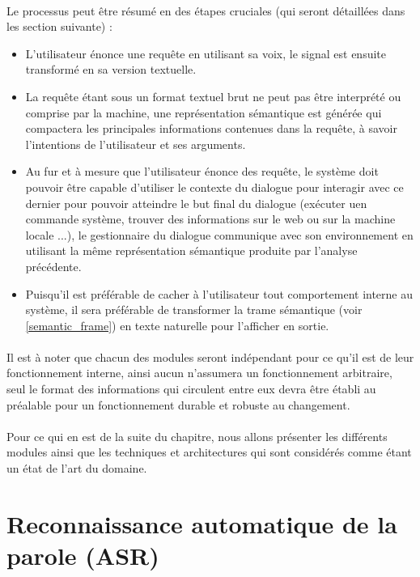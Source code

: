 	\paragraph{}
	Le processus peut être résumé en des étapes cruciales (qui seront détaillées dans les section suivante) : 
	\begin{itemize}
		\item L'utilisateur énonce une requête en utilisant sa voix, le signal est ensuite transformé en sa version textuelle.
		\item La requête étant sous un format textuel brut ne peut pas être interprété ou comprise par la machine, une représentation sémantique est générée qui compactera les principales informations contenues dans la requête, à savoir l'intentions de l'utilisateur et ses arguments.
		\item Au fur et à mesure que l'utilisateur énonce des requête, le système doit pouvoir être capable d'utiliser le contexte du dialogue pour interagir avec ce dernier pour pouvoir atteindre le but final du dialogue (exécuter uen commande système, trouver des informations sur le web ou sur la machine locale ...), le gestionnaire du dialogue communique avec son environnement en utilisant la même représentation sémantique produite par l'analyse précédente.
		\item Puisqu'il est préférable de cacher à l'utilisateur tout comportement interne au système, il sera préférable de transformer la trame sémantique (voir \ref{semantic_frame}) en texte naturelle pour l'afficher en sortie.
	\end{itemize}
	\paragraph{}
	Il est à noter que chacun des modules seront indépendant pour ce qu'il est de leur fonctionnement interne, ainsi aucun n'assumera un fonctionnement arbitraire, seul le format des informations qui circulent entre eux devra être établi au préalable pour un fonctionnement durable et robuste au changement.
	\paragraph{}
	Pour ce qui en est de la suite du chapitre, nous allons présenter les différents modules ainsi que les techniques et architectures qui sont considérés comme étant un état de l'art du domaine. 
\section{Reconnaissance automatique de la parole (ASR)}
